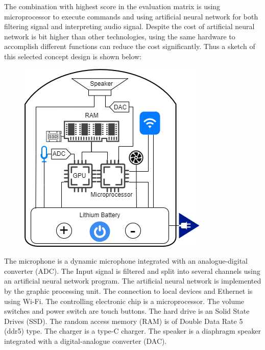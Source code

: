 \documentclass{article}
\begin{document}
The combination with highest score in the evaluation matrix is using microprocessor to execute commands and using artificial neural network for both filtering signal and interpreting audio signal. Despite the cost of artificial neural network is bit higher than other technologies, using the same hardware to accomplish different functions can reduce the cost significantly. Thus a sketch of this selected concept design is shown below:\\
\begin{figure}
\centering
    \includegraphics[scale=0.5]{Concept Sketch}
\end{figure}
The microphone is a dynamic microphone integrated with an analogue-digital converter (ADC). The Input signal is filtered and split into several channels using an artificial neural network program. The artificial neural network is implemented by the graphic processing unit. The connection to local devices and Ethernet is using Wi-Fi. The controlling electronic chip is a microprocessor. The volume switches and power switch are touch buttons. The hard drive is an Solid State Drives (SSD). The random access memory (RAM) is of Double Data Rate 5 (ddr5) type. The charger is a type-C charger. The speaker is a diaphragm speaker integrated with a digital-analogue converter (DAC).
\end{document}
